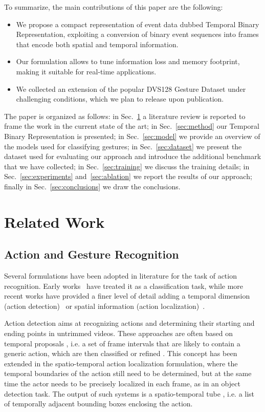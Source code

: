 \documentclass[a4paper,conference]{IEEEtran}
\begin{document}
To summarize, the main contributions of this paper are the following:
\begin{itemize}
    \item We propose a compact representation of event data dubbed Temporal Binary Representation, exploiting a conversion of binary event sequences into frames that encode both spatial and temporal information.
    \item Our formulation allows to tune information loss and memory footprint, making it suitable for real-time applications.
    \item We collected an extension of the popular DVS128 Gesture Dataset under challenging conditions, which we plan to release upon publication.
\end{itemize}

The paper is organized as follows: in Sec.~\ref{sec:related} a literature review is reported to frame the work in the current state of the art; in Sec.~\ref{sec:method} our Temporal Binary Representation is presented; in Sec.~\ref{sec:model} we provide an overview of the models used for classifying gestures; in Sec.~\ref{sec:dataset} we present the dataset used for evaluating our approach and introduce the additional benchmark that we have collected; in Sec.~\ref{sec:training} we discuss the training details; in Sec.~\ref{sec:experiments} and~\ref{sec:ablation} we report the results of our approach; finally in Sec.~\ref{sec:conclusions} we draw the conclusions.

\section{Related Work}
\label{sec:related}
\subsection{Action and Gesture Recognition}
Several formulations have been adopted in literature for the task of action recognition. Early works~\cite{csur2011, poppe2010} have treated it as a classification task, while more recent works have provided a finer level of detail adding a temporal dimension (action detection)~\cite{actoms,serena2016fgv,jcn2016fast,shou2017cvpr,escorcia2020guess,liu2019completeness,nguyen2019weakly} or spatial information (action localization)~\cite{ggjm2015tubes,peng2016multi,saha2016deep, singh2017online, becattini2020progress}.

Action detection aims at recognizing actions and determining their starting and ending points in untrimmed videos.
These approaches are often based on temporal proposals \cite{jcn2016fast}, i.e. a set of frame intervals that are likely to contain a generic action, which are then classified or refined \cite{shou2017cvpr, serena2016fgv}.
This concept has been extended in the spatio-temporal action localization formulation, where the temporal boundaries of the action still need to be determined, but at the same time the actor needs to be precisely localized in each frame, as in an object detection task. The output of such systems is a spatio-temporal tube \cite{ggjm2015tubes, saha2016deep, cuffaro2016segmentation}, i.e. a list of temporally adjacent bounding boxes enclosing the action.
\end{document}
